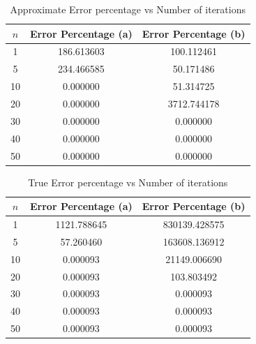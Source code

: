 \documentclass[titlepage, 11pt]{article}
\begin{document}
\begin{table}[!htb]
    \caption{Approximate Error percentage vs Number of iterations}
    \centering
    \begin{tabular}{ccc}
    \toprule
    \textbf{$n$}& \textbf{Error Percentage (a)}& \textbf{Error Percentage (b)}   \\
    \midrule
         1 & 186.613603 & 100.112461 \\
         5 & 234.466585 & 50.171486 \\
         10 & 0.000000 & 51.314725\\
         20 & 0.000000 & 3712.744178 \\
         30 & 0.000000 & 0.000000 \\
         40 & 0.000000 & 0.000000\\
         50 & 0.000000 & 0.000000\\
    \bottomrule
    \end{tabular}
    \label{tab:tab2}
\end{table}
\begin{table}[!htb]
    \caption{True Error percentage vs Number of iterations}
    \centering
    \begin{tabular}{ccc}
    \toprule
    \textbf{$n$}& \textbf{Error Percentage (a)}& \textbf{Error Percentage (b)}   \\
    \midrule
         1 & 1121.788645 & 830139.428575 \\
         5 & 57.260460 & 163608.136912 \\
         10 & 0.000093 & 21149.006690\\
         20 & 0.000093 & 103.803492 \\
         30 & 0.000093 & 0.000093 \\
         40 & 0.000093 & 0.000093\\
         50 & 0.000093 & 0.000093\\
    \bottomrule
    \end{tabular}
    \label{tab:tab82}
\end{table}

\end{document}
